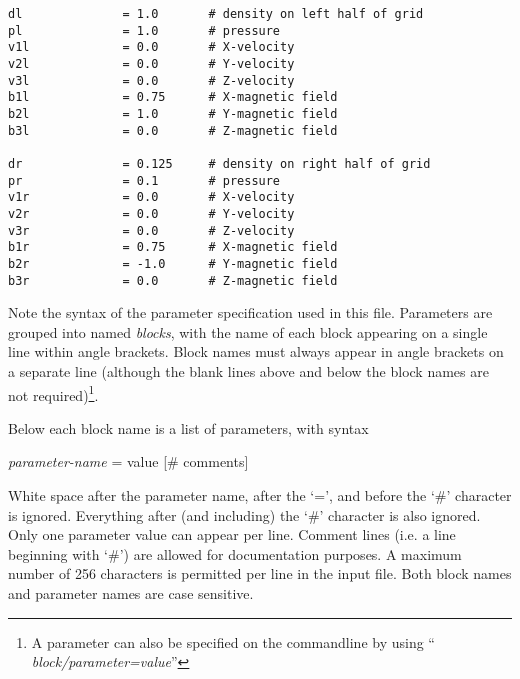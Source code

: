 \begin{verbatim}
dl              = 1.0       # density on left half of grid
pl              = 1.0       # pressure
v1l             = 0.0       # X-velocity
v2l             = 0.0       # Y-velocity
v3l             = 0.0       # Z-velocity
b1l             = 0.75      # X-magnetic field
b2l             = 1.0       # Y-magnetic field
b3l             = 0.0       # Z-magnetic field

dr              = 0.125     # density on right half of grid
pr              = 0.1       # pressure
v1r             = 0.0       # X-velocity
v2r             = 0.0       # Y-velocity
v3r             = 0.0       # Z-velocity
b1r             = 0.75      # X-magnetic field
b2r             = -1.0      # Y-magnetic field
b3r             = 0.0       # Z-magnetic field
\end{verbatim}
\normalsize

Note the syntax of the parameter specification used in this file.
Parameters are grouped into named {\it blocks}, with the name of each
block appearing on a single line within angle brackets.  Block names
must always appear in angle brackets on a separate line (although the
blank lines above and below the block names are not required)\footnote{A
parameter can also be specified on the commandline by using ``{\it
block/parameter=value}''}.

Below each block name is a list of parameters, with syntax
\begin{center}
 {\it parameter-name} = value [\# comments]
\end{center}
White space after the parameter name, after the `=', and before the
`\#' character is ignored.  Everything after (and including) the `\#'
character is also ignored.  Only one parameter value can appear per
line.  Comment lines (i.e. a line beginning with `\#') are allowed for
documentation purposes.  A maximum number of 256 characters is permitted
per line in the input file.  Both block names and parameter names are
case sensitive.

